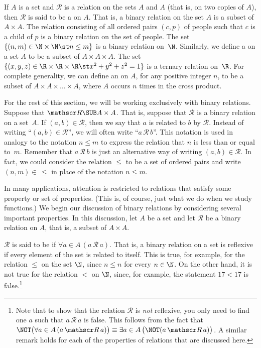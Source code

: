 If $A$ is a set and ${\mathscr R}$ is a relation on the sets $A$ and
$A$ (that is, on two copies of $A$), then $\mathscr R$ is said to be a  on
$A$.  That is, a binary relation on the set $A$ is a subset of
$A\times A$.  The relation consisting of all ordered pairs
$(c,p)$ of people such that $c$ is a child of $p$ is a binary
relation on the set of people.  The set $\{(n,m)\in\N\times\N\st n\le m\}$
is a binary relation on~$\N$.  Similarly, we define
a  on a set $A$ to be a subset of $A\times A\times A$.
The set $\{(x,y,z)\in\R\times\R\times\R\st x^2+y^2+z^2=1\}$ is
a ternary relation on~$\R$.  For complete generality, we can
define an  on $A$, for any positive integer $n$,
to be a subset of $A\times A\times\dots\times A$, where
$A$ occurs $n$ times in the cross product.

For the rest of this section, we will be working exclusively with binary
relations.  Suppose that ${\mathscr R}\SUB A\times A$. That is, suppose
that ${\mathscr R}$ is a binary relation on a set~$A$.
If $(a,b)\in{\mathscr R}$, then we say that $a$ is related to
$b$ by ${\mathscr R}$.  Instead of writing ``$(a,b)\in {\mathscr R}$'',
we will often write ``$a\,{\mathscr R}\,b$''.  This notation is
used in analogy to the notation $n\le m$ to express the relation
that $n$ is less than or equal to~$m$.  Remember that
$a\,{\mathscr R}\,b$ is just an alternative way of writing $(a,b)\in{\mathscr R}$.
In fact, we could consider the relation $\le$ to be a set of
ordered pairs and write $(n,m)\in\,\le$ in place of the notation $n\le m$.

\medbreak

In many applications, attention is restricted to relations that
satisfy some property or set of properties.  (This is, of course,
just what we do when we study functions.)  We begin our discussion
of binary relations by considering several important properties.
In this discussion, let $A$ be a set and let ${\mathscr R}$
be a binary relation on $A$, that is, a subset of $A\times A$.

$\mathscr R$ is said to be  if
$\forall a\in A\,(a \,{\mathscr R}\, a)$.  That is, a binary relation
on a set is reflexive if every element of the set is related
to itself.  This is true, for example, for the relation $\le$ 
on the set $\N$, since $n\le n$ for every $n\in\N$.  On the other
hand, it is not true for the relation $<$ on $\N$, since, for
example, the statement $17<17$ is false.\footnote{Note that to show
that the relation ${\mathscr R}$ is \emph{not} reflexive, you only need to
find one $a$ such that $a\,{\mathscr R}\,a$ is false.  This
follows from the fact that $\NOT\big(\forall a\in A\,(a \,{\mathscr R}\, a)\big)
\equiv \exists a\in A\,\big(\NOT(a \,{\mathscr R}\, a)\big)$.
A similar remark holds for each of the properties of relations
that are discussed here.}

